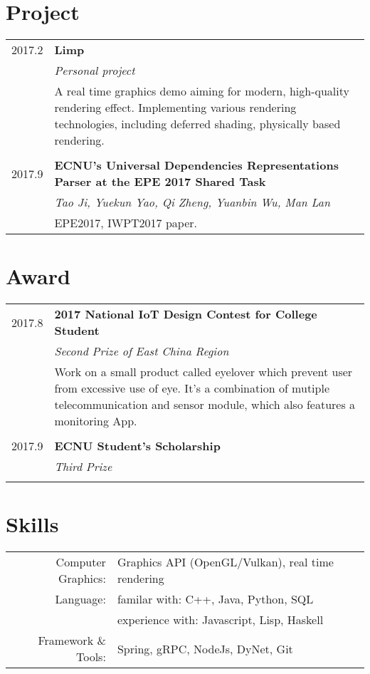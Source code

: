 \documentclass[a4paper,10pt]{article}
\begin{document}
\section{Project}
\begin{tabular}{r|p{12cm}}
 \textsc{\small{2017.2}} & \textbf{Limp}\\&\emph{Personal project}\\&\small{A real time graphics demo aiming for modern, high-quality rendering effect. Implementing various rendering technologies, including deferred shading, physically based rendering.}\\\multicolumn{2}{c}{} \\
\textsc{\small{2017.9}} & \textbf{ECNU's Universal Dependencies Representations Parser at the EPE 2017 Shared Task}\\&\emph{Tao Ji, Yuekun Yao, Qi Zheng, Yuanbin Wu, Man Lan}\\&\small{EPE2017, IWPT2017 paper.}
\end{tabular}


\section{Award}
\begin{tabular}{r|p{12cm}}
 \textsc{\small{2017.8}} & \textbf{2017 National IoT Design Contest for College Student}\\&\emph{Second Prize of East China Region}\\&\small{Work on a small product called eyelover which prevent user from excessive use of eye. It's a combination of mutiple telecommunication and sensor module, which also features a monitoring App.}\\\multicolumn{2}{c}{} \\
\textsc{\small{2017.9}} & \textbf{ECNU Student's Scholarship}\\&\emph{Third Prize}\\&\footnotesize{}
\end{tabular}

\section{Skills}
\begin{tabular}{rp{12cm}}
 Computer Graphics:& Graphics API (OpenGL/Vulkan), real time rendering\\
Language:& familar with: C++, Java, Python, SQL\\
         & experience with: Javascript, Lisp, Haskell\\
Framework \& Tools:& Spring, gRPC, NodeJs, DyNet, Git 
\end{tabular}
\end{document}
